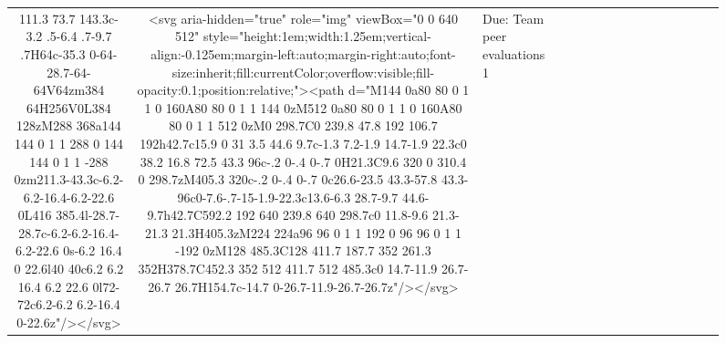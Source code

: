 \documentclass[
]{article}
\begin{document}
\begin{figure*}
\begin{longtable*}{cclllccccccccccl}
111.3 73.7 143.3c-3.2 .5-6.4 .7-9.7 .7H64c-35.3 0-64-28.7-64-64V64zm384 64H256V0L384 128zM288 368a144 144 0 1 1 288 0 144 144 0 1 1 -288 0zm211.3-43.3c-6.2-6.2-16.4-6.2-22.6 0L416 385.4l-28.7-28.7c-6.2-6.2-16.4-6.2-22.6 0s-6.2 16.4 0 22.6l40 40c6.2 6.2 16.4 6.2 22.6 0l72-72c6.2-6.2 6.2-16.4 0-22.6z"/></svg> & <svg aria-hidden="true" role="img" viewBox="0 0 640 512" style="height:1em;width:1.25em;vertical-align:-0.125em;margin-left:auto;margin-right:auto;font-size:inherit;fill:currentColor;overflow:visible;fill-opacity:0.1;position:relative;"><path d="M144 0a80 80 0 1 1 0 160A80 80 0 1 1 144 0zM512 0a80 80 0 1 1 0 160A80 80 0 1 1 512 0zM0 298.7C0 239.8 47.8 192 106.7 192h42.7c15.9 0 31 3.5 44.6 9.7c-1.3 7.2-1.9 14.7-1.9 22.3c0 38.2 16.8 72.5 43.3 96c-.2 0-.4 0-.7 0H21.3C9.6 320 0 310.4 0 298.7zM405.3 320c-.2 0-.4 0-.7 0c26.6-23.5 43.3-57.8 43.3-96c0-7.6-.7-15-1.9-22.3c13.6-6.3 28.7-9.7 44.6-9.7h42.7C592.2 192 640 239.8 640 298.7c0 11.8-9.6 21.3-21.3 21.3H405.3zM224 224a96 96 0 1 1 192 0 96 96 0 1 1 -192 0zM128 485.3C128 411.7 187.7 352 261.3 352H378.7C452.3 352 512 411.7 512 485.3c0 14.7-11.9 26.7-26.7 26.7H154.7c-14.7 0-26.7-11.9-26.7-26.7z"/></svg> & Due: Team peer evaluations 1 \\ 

\end{longtable*}
\end{figure*}
\end{document}
